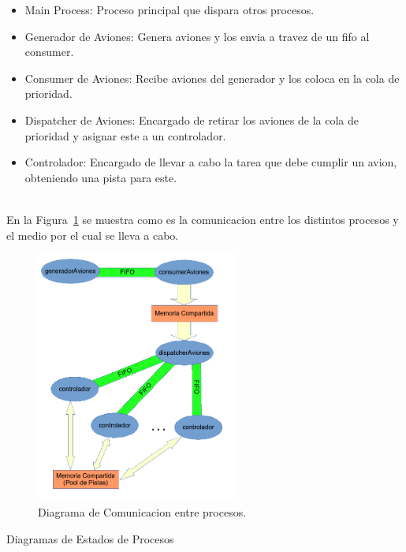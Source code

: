 \documentclass[a4paper,12pt,titlepage]{article}
\begin{document}
\begin{itemize}
\item Main Process: Proceso principal que dispara otros procesos.
\item Generador de Aviones: Genera aviones y los envia a travez de un fifo al consumer.
\item Consumer de Aviones: Recibe aviones del generador y los coloca en la cola de prioridad.
\item Dispatcher de Aviones: Encargado de retirar los aviones de la cola de prioridad y asignar este a un controlador.
\item Controlador: Encargado de llevar a cabo la tarea que debe cumplir un avion, obteniendo una pista para este.
\end{itemize}
\\

En la Figura~\ref{fig:dia_comunicacion_procesos} se muestra como es la comunicacion entre los distintos procesos y el medio por el cual se lleva a cabo.

\begin{figure}
  \centering
    \includegraphics[width=0.6\textwidth] {comunicacion_procesos}
  \caption{Diagrama de Comunicacion entre procesos.}
  \label{fig:dia_comunicacion_procesos}
\end{figure}



Diagramas de Estados de Procesos
\end{document}
